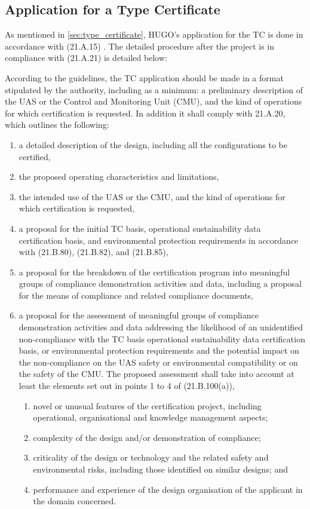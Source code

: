 \subsection{Application for a Type Certificate}
As mentioned in \autoref{sec:type_certificate}, HUGO's application for the TC is done in accordance with (21.A.15) \cite{EASAInitialAirworthiness2025}. The detailed procedure after the project is in compliance with (21.A.21) is detailed below:

According to the guidelines, the TC application should be made in a format stipulated by the authority, including as a minimum: a preliminary description of the UAS or the Control and Monitoring Unit (CMU), and the kind of operations for which certification is requested. In addition it shall comply with 21.A.20, which outlines the following:
\begin{enumerate}
    \item a detailed description of the design, including all the configurations to be certified,
    \item the proposed operating characteristics and limitations,
    \item the intended use of the UAS or the CMU, and the kind of operations for which certification is requested,
    \item a proposal for the initial TC basis, operational sustainability data certification basis, and environmental protection requirements in accordance with (21.B.80), (21.B.82), and (21.B.85),
    \item a proposal for the breakdown of the certification program into meaningful groups of compliance demonstration activities and data, including a proposal for the means of compliance and related compliance documents,
    \item a proposal for the assessment of meaningful groups of compliance demonstration activities and data addressing the likelihood of an unidentified non-compliance with the TC basis operational sustainability data certification basis, or environmental protection requirements and the potential impact on the non-compliance on the UAS safety or environmental compatibility or on the safety of the CMU. The proposed assessment shall take into account at least the elements set out in points 1 to 4 of (21.B.100(a)),
    \begin{enumerate}
    \item novel or unusual features of the certification project, including operational, organisational and knowledge management aspects;
    \item complexity of the design and/or demonstration of compliance;
    \item criticality of the design or technology and the related safety and environmental risks, including those identified on similar designs; and
    \item performance and experience of the design organisation of the applicant in the domain concerned.
    \end{enumerate}
\end{enumerate}


